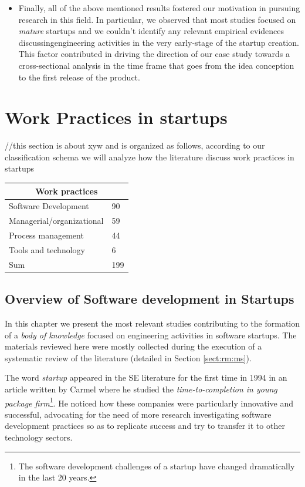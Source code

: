 \documentclass[final,5p,times,twocolumn]{elsarticle}
\begin{document}
\begin{itemize}
\item Finally, all of the above mentioned results fostered our motivation in pursuing research in this field. In particular, we observed that most studies focused on \textit{mature} startups and we couldn't identify any relevant empirical evidences discussingengineering activities in the very early-stage of the startup creation. This factor contributed in driving the direction of our case study towards a cross-sectional analysis in the time frame that goes from the idea conception to the first release of the product.
\end{itemize}

\section{Work Practices in startups}
//this section is about xyw and is organized as follows, according to our classification schema we will analyze how the literature discuss work practices in startups 


\begin{center}
\begin{tabular}{|l|l|}
\hline
\multicolumn{2}{|c|}{\textbf{Work practices}} \\
\hline
Software Development & 90 \\
Managerial/organizational & 59 \\
Process management & 44 \\
Tools and technology & 6 \\
\hline
Sum & 199\\
\hline
\end{tabular}
\end{center}

\subsection{Overview of Software development in Startups} %
\label{sub:challenges}

In this chapter we present the most relevant studies contributing to the formation of a \textit{body of knowledge} focused on engineering activities in software startups.  The materials reviewed here were mostly collected during the execution of a systematic review of the literature (detailed in Section \ref{sect:rm:ms}).

The word \textit{startup} appeared in the SE literature for the first time in 1994 in an article written by Carmel \cite{Camel1994a} where he studied the \textit{time-to-completion in young package firm}\footnote{The software development challenges of a startup have changed dramatically in the last 20 years.}. He noticed how these companies were particularly innovative and successful, advocating for the need of more research investigating software development practices so as to replicate success and try to transfer it to other technology sectors.
\end{document}
